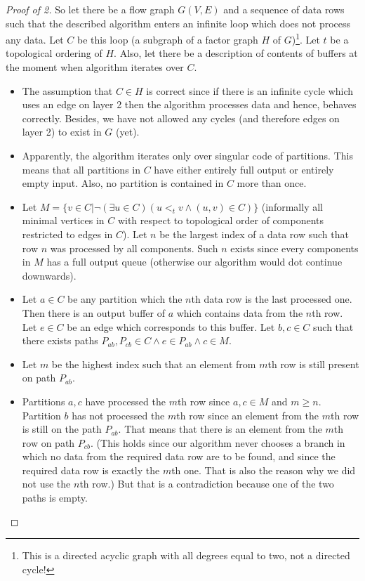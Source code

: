 \begin{proof}[Proof of 2] So let there be a flow graph $G(V,E)$ and a sequence of data rows such that the described algorithm enters an infinite loop which does not process any data. Let $C$ be this loop (a subgraph of a factor graph $H$ of $G$)\footnote{This is a directed acyclic graph with all degrees equal to two, not a directed cycle!}. Let $t$ be a topological ordering of $H$. Also, let there be a description of  contents of buffers at the moment when algorithm iterates over $C$.
  \begin{itemize}
    \item The assumption that $C \in H$ is correct since if there is an infinite cycle which uses an edge on layer 2 then the algorithm processes data and hence, behaves correctly. Besides, we have not allowed any cycles (and therefore edges on layer 2) to exist in $G$ (yet).
    \item Apparently, the algorithm iterates only over singular code of partitions. This means that all partitions in $C$ have either entirely full output or entirely empty input. Also, no partition is contained in $C$ more than once.
    \item Let $M = \{v \in C | \neg (\exists u \in C)( u <_t v \land (u,v) \in C )\}$ (informally all minimal vertices in $C$ with respect to topological order of components restricted to edges in $C$). Let $n$ be the largest index of a data row such that row $n$ was processed by all components. Such $n$ exists since every components in $M$ has a full output queue (otherwise our algorithm would dot continue downwards).

    \item Let $a \in C$ be any partition which the $n$th data row is the last processed one. Then there is an output buffer of $a$ which contains data from the $n$th row. Let $e \in C$ be an edge which corresponds to this buffer.  Let $b,c \in C$ such that there exists paths $P_{ab}, P_{cb} \in C \land e \in P_{ab} \land c \in M$. 

    \item Let $m$ be the highest index such that an element from $m$th row is still present on path $P_{ab}$. 

    \item Partitions $a,c$ have processed the $m$th row since $a,c \in M$ and $m \geq n$. Partition $b$ has not processed the $m$th row since an element from the $m$th row is still on the path $P_{ab}$. That means that there is an element from the $m$th row on path $P_{cb}$. (This holds since our algorithm never chooses a branch in which no data from the required data row are to be found, and since the required data row is exactly the $m$th one. That is also the reason why we did not use the $n$th row.) But that is a contradiction because one of the two paths is empty.

  \end{itemize}

\end{proof}

